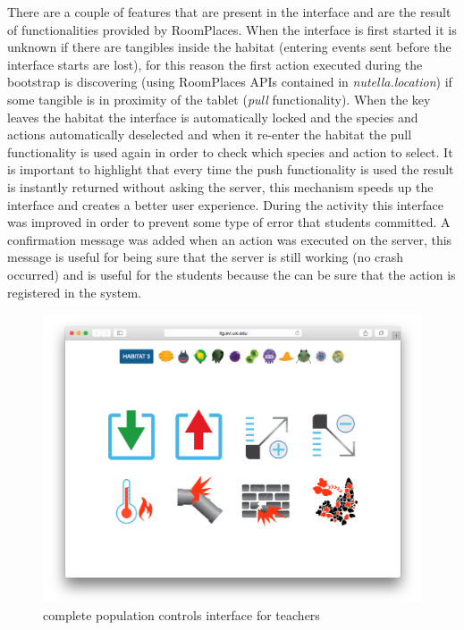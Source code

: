 There are a couple of features that are present in the interface and are the result of functionalities provided by RoomPlaces. When the interface is first started it is unknown if there are tangibles inside the habitat (entering events sent before the interface starts are lost), for this reason the first action executed during the bootstrap is discovering (using RoomPlaces APIs contained in \textit{nutella.location}) if some tangible is in proximity of the tablet (\textit{pull} functionality). When the key leaves the habitat the interface is automatically locked and the species and actions automatically deselected and when it re-enter the habitat the pull functionality is used again in order to check which species and action to select. It is important to highlight that every time the push functionality is used the result is instantly returned without asking the server, this mechanism speeds up the interface and creates a better user experience. During the activity this interface was improved in order to prevent some type of error that students committed. A confirmation message was added when an action was executed on the server, this message is useful for being sure that the server is still working (no crash occurred) and is useful for the students because the can be sure that the action is registered in the system.

\begin{figure}
\centering
\includegraphics[width=4.5in]{images/population-controls-teacher.png}
\caption{complete population controls interface for teachers}
\label{fig:population_controls_teachers}
\end{figure}

